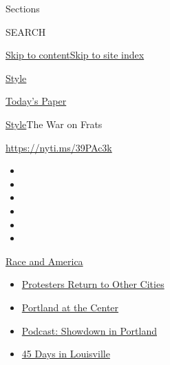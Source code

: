 Sections

SEARCH

\protect\hyperlink{site-content}{Skip to
content}\protect\hyperlink{site-index}{Skip to site index}

\href{https://www.nytimes3xbfgragh.onion/section/style}{Style}

\href{https://myaccount.nytimes3xbfgragh.onion/auth/login?response_type=cookie\&client_id=vi}{}

\href{https://www.nytimes3xbfgragh.onion/section/todayspaper}{Today's
Paper}

\href{/section/style}{Style}\textbar{}The War on Frats

\url{https://nyti.ms/39PAc3k}

\begin{itemize}
\item
\item
\item
\item
\item
\item
\end{itemize}

\href{https://www.nytimes3xbfgragh.onion/news-event/george-floyd-protests-minneapolis-new-york-los-angeles?action=click\&pgtype=Article\&state=default\&region=TOP_BANNER\&context=storylines_menu}{Race
and America}

\begin{itemize}
\tightlist
\item
  \href{https://www.nytimes3xbfgragh.onion/2020/07/26/us/protests-portland-seattle-trump.html?action=click\&pgtype=Article\&state=default\&region=TOP_BANNER\&context=storylines_menu}{Protesters
  Return to Other Cities}
\item
  \href{https://www.nytimes3xbfgragh.onion/2020/07/24/us/portland-oregon-protests-white-race.html?action=click\&pgtype=Article\&state=default\&region=TOP_BANNER\&context=storylines_menu}{Portland
  at the Center}
\item
  \href{https://www.nytimes3xbfgragh.onion/2020/07/23/podcasts/the-daily/portland-protests.html?action=click\&pgtype=Article\&state=default\&region=TOP_BANNER\&context=storylines_menu}{Podcast:
  Showdown in Portland}
\item
  \href{https://www.nytimes3xbfgragh.onion/interactive/2020/07/16/us/black-lives-matter-protests-louisville-breonna-taylor.html?action=click\&pgtype=Article\&state=default\&region=TOP_BANNER\&context=storylines_menu}{45
  Days in Louisville}
\end{itemize}

